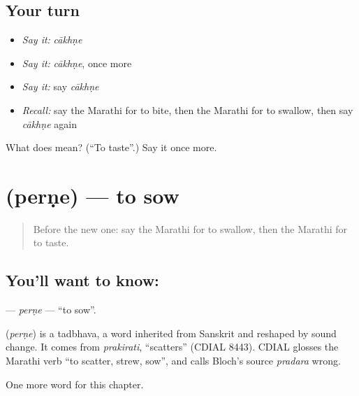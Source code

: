\subsection*{Your turn}
\begin{itemize}
\raggedright
  \item \emph{Say it:} \emph{cākhṇe}
  \item \emph{Say it:} \emph{cākhṇe}, once more
  \item \emph{Say it:} say \emph{cākhṇe}
  \item \emph{Recall:} say the Marathi for to bite, then the Marathi for to swallow, then say \emph{cākhṇe} again
\end{itemize}

\begin{tcolorbox}[breakable,colback=teal!4,colframe=teal!35!black,title={Before you move on}]
What does  mean? (\textquotedblleft{}To taste\textquotedblright{}.) Say it once more.
\end{tcolorbox}
\section[\texorpdfstring{\mr{पेरणे} (perṇe)}{पेरणे (perṇe)}]{ (perṇe) — to sow}

\label{lesson:MR-C157-perne}



\begin{quote}
Before the new one: say the Marathi for to swallow, then the Marathi for to taste.
\end{quote}

\subsection*{You'll want to know: }
\textbf{} — \emph{perṇe} — \textquotedblleft{}to sow\textquotedblright{}.

\begin{cousinweb}
\textbf{} (\emph{perṇe}) is a tadbhava, a word inherited from Sanskrit and reshaped by sound change. It comes from \emph{prakirati}, \textquotedblleft{}scatters\textquotedblright{} (CDIAL 8443). CDIAL glosses the Marathi verb \textquotedblleft{}to scatter, strew, sow\textquotedblright{}, and calls Bloch's source \emph{pradara} wrong.
\end{cousinweb}

\begin{grammarlens}[title={What you've built}]
One more word for this chapter.
\end{grammarlens}

